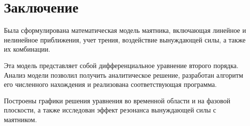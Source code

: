 \chapter{Заключение}
Была сформулирована математическая модель маятника, включающая линейное и нелинейное приближения, учет трения, воздействие вынуждающей силы, а также их комбинации. 

Эта модель представляет собой дифференциальное уравнение второго порядка. Анализ модели позволил получить аналитическое решение, разработан алгоритм его численного нахождения и реализована соответствующая программа. 

Построены графики решения уравнения во временной области и на фазовой плоскости, а также исследован эффект резонанса вынуждающей силы с маятником.
